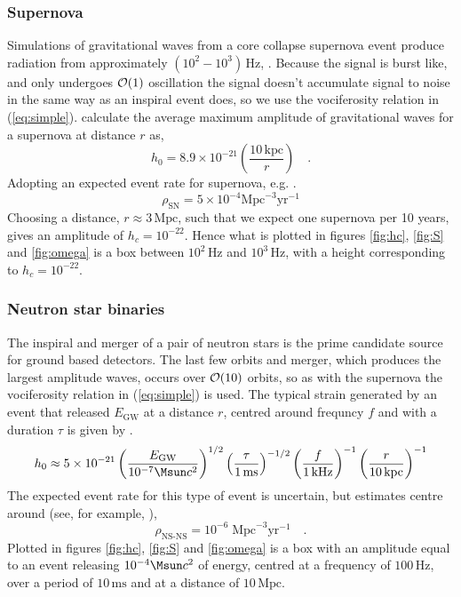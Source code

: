 \subsubsection{Supernova}
Simulations of gravitational waves from a core collapse supernova event produce radiation from approximately $(10^{2}-10^{3})\,\textrm{Hz}$, \cite{2002A&A...393..523D}. Because the signal is burst like, and only undergoes ${\cal{O}}(1)$ oscillation the signal doesn't accumulate signal to noise in the same way as an inspiral event does, so we use the vociferosity relation in (\ref{eq:simple}). \cite{2002A&A...393..523D} calculate the average maximum amplitude of gravitational waves for a supernova at distance $r$ as, 
\begin{equation} h_{0}=8.9\times 10^{-21}\left( \frac{10 \,\textrm{kpc}}{r} \right) \quad .\end{equation}
Adopting an expected event rate for supernova, e.g. \cite{2013ASPC..467...59S}.
\begin{equation} \rho_{\textrm{SN}}=5\times10^{-4}\textrm{Mpc}^{-3}\textrm{yr}^{-1} \end{equation}
Choosing a distance, $r\approx 3 \,\textrm{Mpc}$, such that we expect one supernova per 10 years, gives an amplitude of $h_{c}=10^{-22}$. Hence what is plotted in figures \ref{fig:hc}, \ref{fig:S} and \ref{fig:omega} is a box between $10^{2}\,\textrm{Hz}$ and $10^{3}\,\textrm{Hz}$, with a height corresponding to $h_{c}=10^{-22}$.

\subsubsection{Neutron star binaries}
The inspiral and merger of a pair of neutron stars is the prime candidate source for ground based detectors. The last few orbits and merger, which produces the largest amplitude waves, occurs over ${\cal{O}}(10)$ orbits, so as with the supernova the vociferosity relation in (\ref{eq:simple}) is used. The typical strain generated by an event that released $E_{\textrm{GW}}$ at a distance $r$, centred around frequncy $f$ and with a duration $\tau$ is given by \cite{2013ASPC..467...59S}.
\begin{equation} h_{0}\approx 5\times 10^{-21}\left(\frac{E_{\textrm{GW}}}{10^{-7}\Msun c^{2}}\right)^{1/2}\left( \frac{\tau}{1\,\textrm{ms}} \right)^{-1/2}\left( \frac{f}{1\,\textrm{kHz}} \right)^{-1}\left( \frac{r}{10\,\textrm{kpc}} \right)^{-1} \end{equation}
The expected event rate for this type of event is uncertain, but estimates centre around (see, for example, \cite{2011PrPNP..66..239A}),
\begin{equation} \rho_{\textrm{NS-NS}}=10^{-6}\;\textrm{Mpc}^{-3}\textrm{yr}^{-1} \quad .\end{equation}
Plotted in figures \ref{fig:hc}, \ref{fig:S} and \ref{fig:omega} is a box with an amplitude equal to an event releasing $10^{-4}\Msun c^{2}$ of energy, centred at a frequency of $100\,\textrm{Hz}$, over a period of $10\,\textrm{ms}$ and at a distance of $10\,\textrm{Mpc}$.










